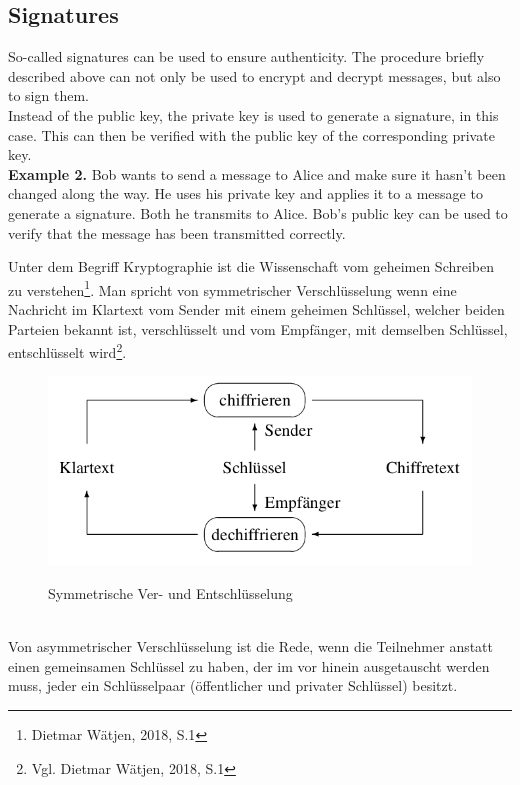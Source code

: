 {		\subsection{Signatures}
		So-called signatures can be used to ensure authenticity. The procedure briefly described above can not only be used to encrypt and decrypt messages, but also to sign them.\\
		Instead of the public key, the private key is used to generate a signature, in this case. This can then be verified with the public key of the corresponding private key.\\
		\textbf{Example 2.} Bob wants to send a message to Alice and make sure it hasn't been changed along the way. He uses his private key and applies it to a message to generate a signature. Both he transmits to Alice. Bob's public key can be used to verify that the message has been transmitted correctly.
	}{
		\glqq Unter dem Begriff Kryptographie ist die Wissenschaft vom geheimen Schreiben zu verstehen\grqq\footnote{Dietmar Wätjen, 2018, S.1}. Man spricht von symmetrischer Verschlüsselung wenn eine Nachricht im Klartext vom Sender mit einem geheimen Schlüssel, welcher beiden Parteien bekannt ist, verschlüsselt und vom Empfänger, mit demselben Schlüssel, entschlüsselt wird\footnote{Vgl. Dietmar Wätjen, 2018, S.1}.\\
		\begin{figure}[h]
			\begin{minipage}{\textwidth}
				\centering
				\includegraphics[scale=0.5]{figures/ver-und-entschluesseln.png}
				\label{ver-und-entschluesselung}
				\caption{Symmetrische Ver- und Entschlüsselung}
			\end{minipage}
		\end{figure}\\
		Von asymmetrischer Verschlüsselung ist die Rede, wenn die Teilnehmer anstatt einen gemeinsamen Schlüssel zu haben, der im vor hinein ausgetauscht werden muss, jeder ein Schlüsselpaar (öffentlicher und privater Schlüssel) besitzt.
}
